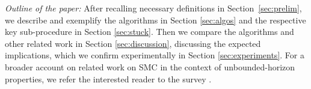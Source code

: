 \emph{Outline of the paper:}
After recalling necessary definitions in Section~\ref{sec:prelim}, we describe and exemplify the algorithms in Section \ref{sec:algos} and the respective key sub-procedure in Section \ref{sec:stuck}.
Then we compare the algorithms and other related work in Section \ref{sec:discussion}, discussing the expected implications, which we confirm experimentally in Section \ref{sec:experiments}.
For a broader account on related work on SMC in the context of unbounded-horizon properties, we refer the interested reader to the survey \cite{isola-survey}.


%
%
%
%
%
%
%
%
%
%
%
%
